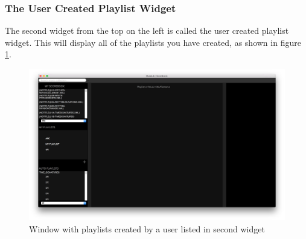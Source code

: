 \subsubsection{The User Created Playlist Widget}
The second widget from the top on the left is called the user created playlist widget. This will display all of the playlists you have created, as shown in figure \ref{fig:createdplaylists}. 
\begin{figure}[H]
\centering
\includegraphics[width=500pt]{createdplaylists}
\caption{Window with playlists created by a user listed in second widget}
\label{fig:createdplaylists}	
\end{figure}

